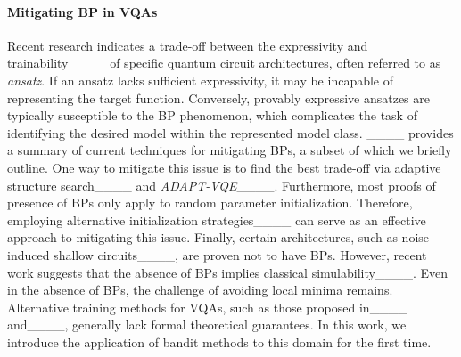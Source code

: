 \paragraph*{Mitigating BP in VQAs}
Recent research indicates a trade-off between the expressivity and trainability____ of specific quantum circuit architectures, often referred to as \emph{ansatz}. If an ansatz lacks sufficient expressivity, it may be incapable of representing the target function. Conversely, provably expressive ansatzes are typically susceptible to the BP phenomenon, which complicates the task of identifying the desired model within the represented model class. 
____ provides a summary of current techniques for mitigating BPs, a subset of which we briefly outline. One way to mitigate this issue is to find the best trade-off via adaptive structure search____ and \emph{ADAPT-VQE}____. Furthermore, most proofs of presence of BPs only apply to random parameter initialization. Therefore, employing alternative initialization strategies____ can serve as an effective approach to mitigating this issue. Finally, certain architectures, such as noise-induced shallow circuits____, are proven not to have BPs. However, recent work suggests that the absence of BPs implies classical simulability____. Even in the absence of BPs, the challenge of avoiding local minima remains. Alternative training methods for VQAs, such as those proposed in____ and____, generally lack formal theoretical guarantees. In this work, we introduce the application of bandit methods to this domain for the first time.
